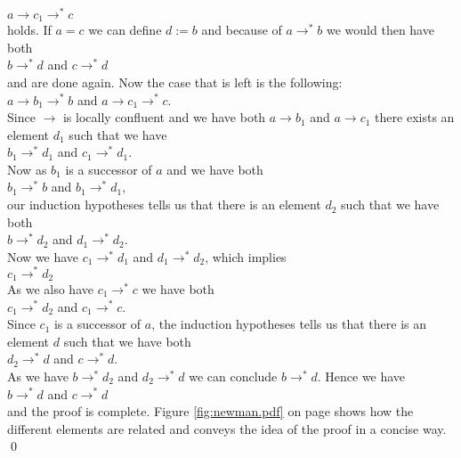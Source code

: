 \\[0.2cm]
\hspace*{1.3cm}
$a \rightarrow c_1 \rightarrow^* c$
\\[0.2cm]
holds.  If $a = c$ we can define $d := b$ and because of $a \rightarrow^* b$ we would then have both
\\[0.2cm]
\hspace*{1.3cm}
$b \rightarrow^* d$ \quad and \quad $c \rightarrow^* d$
\\[0.2cm]
and are done again.  Now the case that is left is the following:
\\[0.2cm]
\hspace*{1.3cm}
$a \rightarrow b_1 \rightarrow^* b$ \quad and \quad $a \rightarrow c_1 \rightarrow^* c$.
\\[0.2cm]
Since $\rightarrow$ is locally confluent and we have both $a \rightarrow b_1$ and  $a \rightarrow c_1$ 
there exists an element $d_1$ such that we have
\\[0.2cm]
\hspace*{1.3cm}
$b_1 \rightarrow^* d_1$ \quad and \quad $c_1 \rightarrow^* d_1$.
\\[0.2cm]
Now as $b_1$ is a successor of $a$ and we have both
\\[0.2cm]
\hspace*{1.3cm}
$b_1 \rightarrow^* b$ \quad and \quad $b_1 \rightarrow^* d_1$,
\\[0.2cm]
our induction hypotheses tells us that there is an element $d_2$ such that we have both
\\[0.2cm]
\hspace*{1.3cm}
$b \rightarrow^* d_2$ \quad and \quad $d_1 \rightarrow^* d_2$.
\\[0.2cm]
Now we have $c_1 \rightarrow^* d_1$ and $d_1 \rightarrow^* d_2$, which implies
\\[0.2cm]
\hspace*{1.3cm}
$c_1 \rightarrow^* d_2$
\\[0.2cm]
As we also have $c_1 \rightarrow^* c$ we have both
\\[0.2cm]
\hspace*{1.3cm}
$c_1 \rightarrow^* d_2$ \quad and \quad $c_1 \rightarrow^* c$.
\\[0.2cm]
Since $c_1$ is a successor of $a$, the induction hypotheses tells us that there is an element $d$ such that we
have both
\\[0.2cm]
\hspace*{1.3cm}
$d_2 \rightarrow^* d$ \quad and \quad $c \rightarrow^* d$.
\\[0.2cm]
As we have $b \rightarrow^* d_2$ and $d_2 \rightarrow^* d$ we can conclude $b \rightarrow^* d$.  Hence we have
\\[0.2cm]
\hspace*{1.3cm}
$b \rightarrow^* d$ \quad  and \quad $c \rightarrow^* d$
\\[0.2cm]
and the proof is complete.  Figure \ref{fig:newman.pdf} on page \pageref{fig:newman.pdf} shows how the
different elements are related and conveys the idea of the proof in a concise way. \qed

